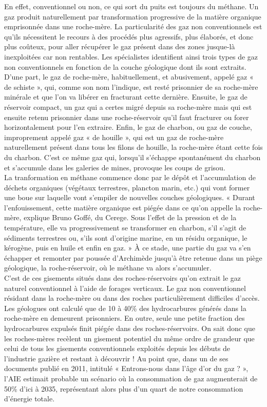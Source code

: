 \documentclass[8pt]{article}
\begin{document}
En effet, conventionnel ou non, ce qui sort du puits est toujours du méthane. Un gaz produit naturellement par transformation progressive de la matière organique emprisonnée dans une roche-mère. La particularité des gaz non conventionnels est qu’ils nécessitent le recours à des procédés plus agressifs, plus élaborés, et donc plus coûteux, pour aller récupérer le gaz présent dans des zones jusque-là inexploitées car non rentables. Les spécialistes identifient ainsi trois types de gaz non conventionnels en fonction de la couche géologique dont ils sont extraits. D’une part, le gaz de roche-mère, habituellement, et abusivement, appelé gaz « de schiste », qui, comme son nom l’indique, est resté prisonnier de sa roche-mère minérale et que l’on va libérer en fracturant cette dernière. Ensuite, le gaz de réservoir compact, un gaz qui a certes migré depuis sa roche-mère mais qui est ensuite retenu prisonnier dans une roche-réservoir qu’il faut fracturer ou forer horizontalement pour l’en extraire. Enfin, le gaz de charbon, ou gaz de couche, improprement appelé gaz « de houille », qui est un gaz de roche-mère naturellement présent dans tous les filons de houille, la roche-mère étant cette fois du charbon. C’est ce même gaz qui, lorsqu’il s’échappe spontanément du charbon et s’accumule dans les galeries de mines, provoque les coups de grisou. \\


La tranformation en méthane commence donc par le dépôt et l’accumulation de déchets organiques (végétaux terrestres, plancton marin, etc.) qui vont former une boue sur laquelle vont s’empiler de nouvelles couches géologiques. « Durant l’enfouissement, cette matière organique est piégée dans ce qu’on appelle la roche-mère, explique Bruno Goffé, du Cerege. Sous l’effet de la pression et de la température, elle va progressivement se transformer en charbon, s’il s’agit de sédiments terrestres ou, s’ils sont d’origine marine, en un résidu organique, le kérogène, puis en huile et enfin en gaz. » À ce stade, une partie du gaz va s’en échapper et remonter par poussée d’Archimède jusqu’à être retenue dans un piège géologique, la roche-réservoir, où le méthane va alors s’accumuler. \\

C’est de ces gisements situés dans des roches-réservoirs qu’on extrait le gaz naturel conventionnel à l’aide de forages verticaux. Le gaz non conventionnel résidant dans la roche-mère ou dans des roches particulièrement difficiles d’accès. Les géologues ont calculé que de 10 à 40\% des hydrocarbures générés dans la roche-mère en demeurent prisonniers. En outre, seule une petite fraction des hydrocarbures expulsés finit piégée dans des roches-réservoirs. On sait donc que les roches-mères recèlent un gisement potentiel du même ordre de grandeur que celui de tous les gisements conventionnels exploités depuis les débuts de l’industrie gazière et restant à découvrir ! Au point que, dans un de ses documents publié en 2011, intitulé « Entrons-nous dans l’âge d’or du gaz ? », l’AIE estimait probable un scénario où la consommation de gaz augmenterait de 50\% d’ici à 2035, représentant alors plus d’un quart de notre consommation d’énergie totale. \\
\end{document}
